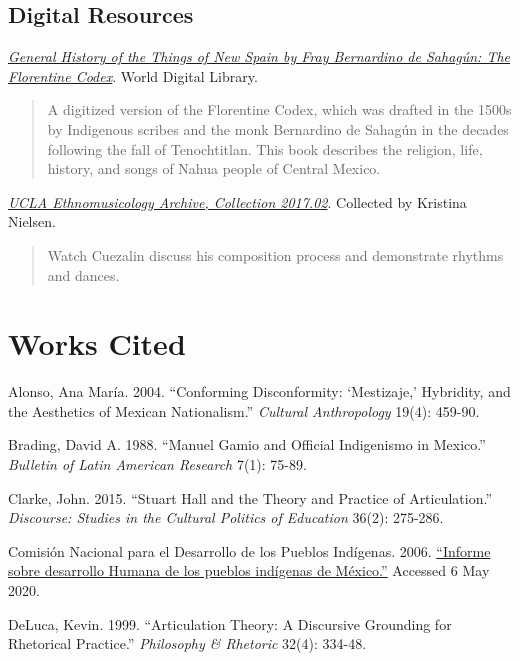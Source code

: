 \documentclass{scrartcl}
\begin{document}
\hypertarget{digital-resources}{%
\subsection{Digital Resources}\label{digital-resources}}

 \emph{\href{https://www.wdl.org/en/item/10096/}{General
History of the Things of New Spain by Fray Bernardino de Sahagún: The
Florentine Codex}}. World Digital Library.

\begin{quote}
A digitized version of the Florentine Codex, which was drafted in the
1500s by Indigenous scribes and the monk Bernardino de Sahagún in the
decades following the fall of Tenochtitlan. This book describes the
religion, life, history, and songs of Nahua people of Central Mexico.
\end{quote}


\href{https://archive.org/details/calauem_201702_item_16_6-9/DSC_0003_Cuezalin+talking+about+and+playing+Maquil+Xochitl+and+Nayeli.MOV}{\emph{UCLA
Ethnomusicology Archive, Collection 2017.02}}. Collected by Kristina
Nielsen.

\begin{quote}
Watch Cuezalin discuss his composition process and demonstrate rhythms
and dances.
\end{quote}

\hypertarget{works-cited}{%
\section{Works Cited}\label{works-cited}}

 Alonso, Ana María. 2004. ``Conforming Disconformity:
`Mestizaje,' Hybridity, and the Aesthetics of Mexican Nationalism.''
\emph{Cultural Anthropology} 19(4): 459-90.

 Brading, David A. 1988. ``Manuel Gamio and Official
Indigenismo in Mexico.'' \emph{Bulletin of Latin American Research}
7(1): 75-89.

 Clarke, John. 2015. ``Stuart Hall and the Theory and Practice
of Articulation.'' \emph{Discourse: Studies in the Cultural Politics of
Education} 36(2): 275-286.

 Comisión Nacional para el Desarrollo de los Pueblos
Indígenas. 2006.
\href{http://www.cdi.gob.mx/idh/informe_desarrollo_humano_pueblos_indigenas_mexico_2006.pdf}{``Informe
sobre desarrollo Humana de los pueblos indígenas de México.''} Accessed
6 May 2020.

 DeLuca, Kevin. 1999. ``Articulation Theory: A Discursive
Grounding for Rhetorical Practice.'' \emph{Philosophy \& Rhetoric}
32(4): 334-48.
\end{document}
